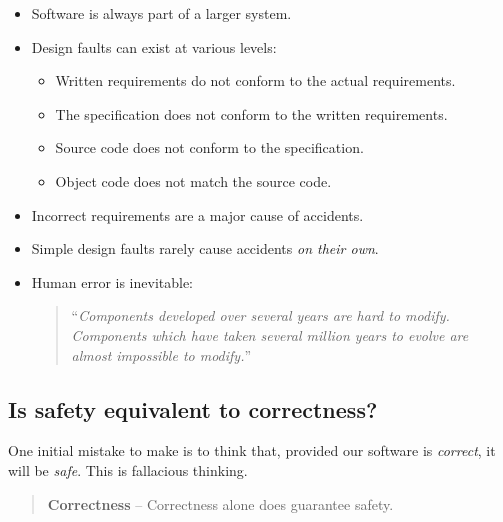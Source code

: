 \begin{itemize}

    \item Software is always part of a larger system. 
    
    \item Design faults can exist at various levels:
    
        \begin{itemize}
        
        \item Written requirements do not conform to the actual
          requirements.
           
           \item The specification does not conform to the written 
           requirements.
           
           \item Source code does not conform to the specification.
           
           \item Object code does not match the source code.
        
        \end{itemize}
    
    \item Incorrect requirements are a major cause of accidents.
    
    \item Simple design faults rarely cause accidents \emph{on their
    own}.    

    \item Human error is inevitable:

    \begin{quote}
      ``\emph{Components
    developed over several years are hard to modify. Components which
    have taken several million years to evolve are almost impossible to
    modify.}''
   \end{quote}

\end{itemize}

\subsection*{Is safety equivalent to correctness?}

One initial mistake to make is to think that, provided our software is \emph{correct}, it will be \emph{safe}. This is fallacious thinking.

\begin{quote}
 \textbf{Correctness} -- Correctness alone does guarantee safety.
\end{quote}


